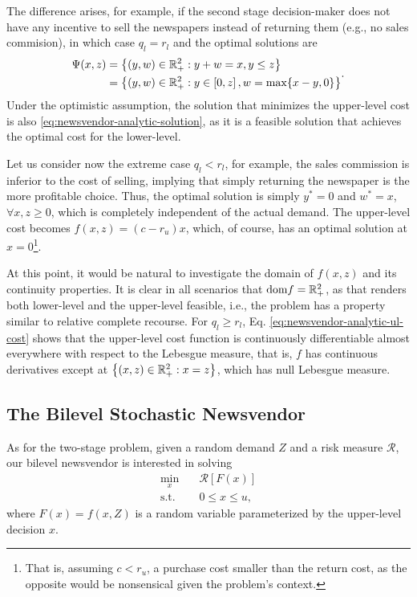 \documentclass[12pt]{article}
\begin{document}
The difference arises, for example, if the second stage decision-maker does not have any incentive to sell the newspapers instead of returning them (e.g., no sales commision), in which case $q_l = r_l$ and the optimal solutions are
\begin{equation*}
\begin{split}
    \Psi(x,z) &= \left\{ (y,w)\in \mathbb{R}^2_{+} : y+w = x, y\le z \right\} \\
	      &= \left\{ (y,w)\in \mathbb{R}^2_{+} : y \in \left[ 0,z \right] , w = \max\{x-y,0\} \right\} 
\end{split}
.\end{equation*}
Under the optimistic assumption, the solution that minimizes the upper-level cost is also \eqref{eq:newsvendor-analytic-solution}, as it is a feasible solution that achieves the optimal cost for the lower-level.

Let us consider now the extreme case $q_l < r_l$, for example, the sales commission is inferior to the cost of selling, implying that simply returning the newspaper is the more profitable choice.
Thus, the optimal solution is simply $y^{*}=0$ and $w^{*}=x$, $\forall x,z\ge 0$, which is completely independent of the actual demand.
The upper-level cost becomes $f(x,z) = (c - r_u) x$, which, of course, has an optimal solution at  $x=0$\footnote{That is, assuming $c< r_u$, a purchase cost smaller than the return cost, as the opposite would be nonsensical given the problem's context.}.

At this point, it would be natural to investigate the domain of $f(x,z)$ and its continuity properties.
It is clear in all scenarios that $\text{dom} f = \mathbb{R}^{2}_{+}$, as that renders both lower-level and the upper-level feasible, i.e., the problem has a property similar to relative complete recourse.
For $q_l \ge r_l$, Eq. \eqref{eq:newsvendor-analytic-ul-cost} shows that the upper-level cost function is continuously differentiable almost everywhere with respect to the Lebesgue measure, that is, $f$ has continuous derivatives except at $\left\{ (x,z) \in \mathbb{R}^2_{+} : x = z \right\}$, which has null Lebesgue measure.


\subsection*{The Bilevel Stochastic Newsvendor}

As for the two-stage problem, given a random demand $Z$ and a risk measure $\mathcal{R}$, our bilevel newsvendor is interested in solving
\begin{equation}
\begin{split}
    \min_{x} \quad & \mathcal{R}[F(x)] \\
    \textrm{s.t.} \quad & 0\le x\le u
,\end{split}
\end{equation}
where $F(x)=f(x,Z)$ is a random variable parameterized by the upper-level decision $x$.
\end{document}
